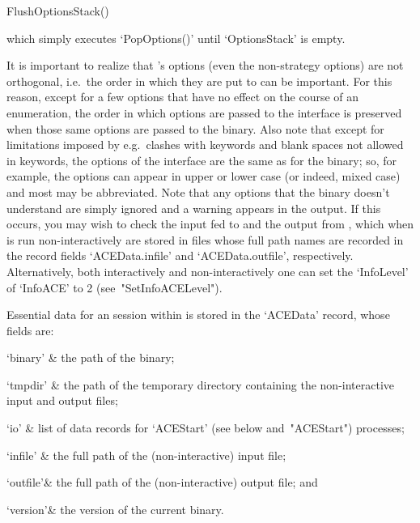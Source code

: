 \>FlushOptionsStack()

which simply executes `PopOptions()' until `OptionsStack' is empty.

\enditems

It  is  important  to  realize  that  {\ACE}'s   options   (even   the
non-strategy options) are not orthogonal, i.e.\  the  order  in  which
they are put to {\ACE} can be important. For this reason, except for a
few options that have no effect on the course of an  enumeration,  the
order in which options are passed to the {\ACE} interface is preserved
when those same options are passed to the  {\ACE}  binary.  Also  note
that except for limitations  imposed  by  {\GAP}  e.g.\  clashes  with
{\GAP} keywords and blank spaces not allowed in keywords, the  options
of the {\ACE} interface are the  same  as  for  the  binary;  so,  for
example, the options can appear in upper or  lower  case  (or  indeed,
mixed case) and most may be abbreviated. Note that  any  options  that
the {\ACE} binary doesn't understand are simply ignored and a  warning
appears in the {\ACE} output. If this occurs, you may  wish  to  check
the input fed to {\ACE} and the output from {\ACE}, which when  {\ACE}
is run non-interactively are stored in files whose full path names are
recorded in the record fields `ACEData.infile' and  `ACEData.outfile',
respectively. Alternatively, both interactively and  non-interactively
one can set the `InfoLevel' of `InfoACE' to 2 (see~"SetInfoACELevel").


Essential data for an {\ACE} session within {\GAP} is  stored  in  the
`ACEData'{\undoquotes{}}   record,
whose fields are:

\beginitems

\quad`binary' & the path of the {\ACE} binary;

\quad`tmpdir' & the path of the  temporary  directory  containing  the
non-interactive {\ACE} input and output files;

\quad`io'     & list  of  data  records  for  `ACEStart'   (see  below 
and~"ACEStart") processes;

\quad`infile' & the full path of the  (non-interactive)  {\ACE}  input
file;

\quad`outfile'& the full path of the (non-interactive)  {\ACE}  output
file; and

\quad`version'& the version of the current {\ACE} binary.

